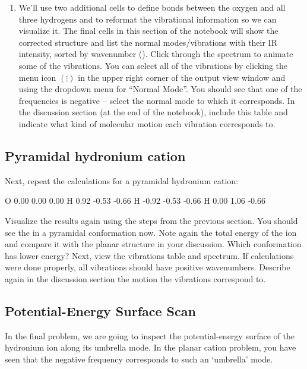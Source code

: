 \begin{enumerate}
  \item   We'll use two additional cells to define bonds between the oxygen and all three hydrogens and to reformat the vibrational information so we can visualize it. 
  The final cells in this section of the notebook will show the corrected structure and list the normal modes/vibrations with their IR intensity, sorted by wavenumber (\si{\wn}). 
  Click through the spectrum to animate some of the vibrations. 
  You can select all of the vibrations by clicking the menu icon \( (\vdots) \) in the upper right corner of the output view window and using the dropdown menu for ``Normal Mode''. 
  You should see that one of the frequencies is negative -- select the normal mode to which it corresponds. 
  In the discussion section (at the end of the notebook), include this table and indicate what kind of molecular motion each vibration corresponds to. 

\end{enumerate}


\subsection*{Pyramidal hydronium cation}

Next, repeat the calculations for a pyramidal hydronium cation: 
\begin{gaussinput}[title=Contents of \Verb{geom_pyramidal.xyz}]
O    0.00   0.00   0.00 
H    0.92  -0.53  -0.66 
H   -0.92  -0.53  -0.66 
H    0.00   1.06  -0.66 

\end{gaussinput}
Visualize the results again using the steps from the previous section. 
You should see the  in a pyramidal conformation now.  
Note again the total energy of the ion and compare it with the planar structure in your discussion. 
Which conformation has lower energy? 
Next, view the vibrations table and spectrum. 
If calculations were done properly, all vibrations should have positive wavenumbers. 
Describe again in the discussion section the motion the vibrations correspond to. 


\subsection*{Potential-Energy Surface Scan}

In the final problem, we are going to inspect the potential-energy surface of the hydronium ion along its umbrella mode. In the planar cation problem, you have seen that the negative frequency corresponds to such an `umbrella' mode. 

